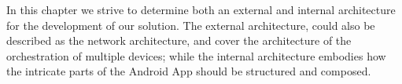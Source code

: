 In this chapter we strive to determine both an external and internal architecture for the development of our solution.
The external architecture, could also be described as the network architecture, and cover the architecture of the orchestration of multiple devices;
while the internal architecture embodies how the intricate parts of the Android App should be structured and composed.
